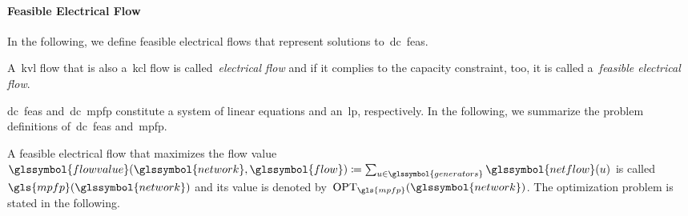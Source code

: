 \paragraph{Feasible Electrical Flow}
\label{ch:network-analyzes:sec:mathematical-model:paragraph:feasible-electrical-flow}
% 
In the following, we define feasible electrical flows that represent solutions
to~\gls{dc}~\gls{feas}.
% 
\begin{definition}
    A~\gls{kvl} flow that is also a~\gls{kcl} flow is called~\emph{electrical
    flow} and if it complies to the capacity constraint, too, it is
    called a~\emph{feasible electrical flow}.
    \label{ch:network-analyzes:sec:mathematical-model:def:kvl-kcl-feasible-flow}
\end{definition}
% 
\gls{dc}~\gls{feas} and~\gls{dc}~\gls{mpfp} constitute a system of linear
equations and an~\gls{lp}, respectively. In the following, we summarize the
problem definitions of~\gls{dc}~\gls{feas} and~\gls{mpfp}.
% 
\begingroup
    
    \label{ch:networkAnalysis:problems:DC_FEAS_Exact-Decision_Problem}
\endgroup
% 
A feasible electrical flow that maximizes the flow value~$
\glssymbol{flowvalue}(\glssymbol{network},\glssymbol{flow})
\coloneqq 
\sum_{\vertexa\in\glssymbol{generators}}
\glssymbol{netflow}(\vertexa)
$
is called~$\gls{mpfp}(\glssymbol{network})$ and its value is denoted
by~$\opt_{\gls{mpfp}}(\glssymbol{network})$. The optimization problem is stated
in the following.
%
\begingroup
    
    \label{ch:networkAnalysis:problems:DC_MPF-Decision_Problem}
\endgroup
%

